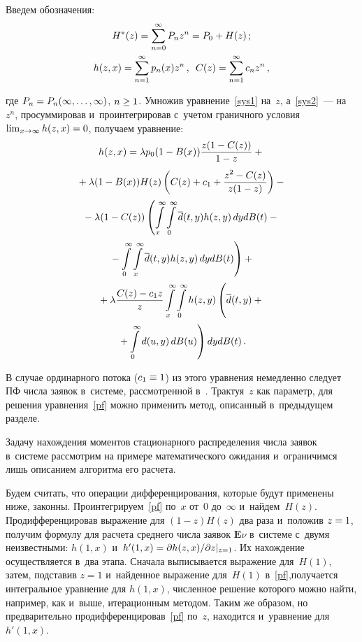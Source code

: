 \begin{multicols}{2}
Введем обозначения:
\begin{gather*}
H^*(z)=\sum\limits_{n=0}^\infty  P_n z^n=
P_0+H(z)\,; \\
h(z,x)=\sum\limits_{n=1}^\infty  p_n(x) z^n\,, \enskip
C(z)= \sum\limits_{n=1}^\infty  c_n z^n\,,
\end{gather*}

\noindent где $P_n\hm=P_n(\infty,\ld,\infty)$, $n \hm\ge 1$.
Умножив уравнение~\eqref{sys1} на~$z$, а~\eqref{sys2}~---
на~$z^n$, просуммировав и~проинтегрировав
с~учетом граничного условия $\lim\nolimits_{x\to \infty} h(z,x)\hm= 0$,
получаем уравнение:
\begin{multline}
h(z,x) = \lambda p_0 (1-B(x)) \displaystyle\frac{\displaystyle z (1-C(z))\mathstrut}{\displaystyle 1-z\mathstrut}
+ {}\\[2pt]
{}+
\lambda (1-B(x))  H(z) \left ( C(z) + c_1 + \displaystyle\frac{\displaystyle z^2 - C(z)\mathstrut}{\displaystyle z(1-z)\mathstrut} \right )
- {}
\\[2pt]
{}- \lambda (1- C(z)) \left(
\int\limits_x^\infty \int\limits_0^\infty \overline d(t,y) h(z,y)\, dy  dB(t) -{}\right.\\[2pt]
\left.{}-
\int\limits_0^\infty \int\limits_x^\infty \overline d(t,y) h(z,y)\, dy  dB(t)
\right)
+{}
\\[2pt]
{}+
\lambda \displaystyle\frac{\displaystyle C(z)-c_1 z\mathstrut}{\displaystyle z\mathstrut} \int\limits_x^\infty
\int\limits_0^\infty h(z,y) \left(
\vphantom{\int\limits_0^\infty}
\overline d(t,y) +{}\right.\\[2pt]
\left.{}+ \int\limits_0^\infty d(u,y) \,dB(u) \right)
dy  dB(t)\,.
\label{pf}
\end{multline}

\noindent В случае ординарного потока ($c_1 \hm\equiv 1$) из этого уравнения 
немедленно следует ПФ
числа заявок в~системе, рассмотренной в~\cite{n3}. Трактуя~$z$ как параметр,
для решения уравнения~\eqref{pf} можно применить метод, описанный 
в~предыдущем разделе.

Задачу нахождения моментов стационарного распределения
числа заявок в~системе рассмотрим на примере математического ожидания
и~ограничимся лишь описанием алгоритма его расчета.

Будем считать, что операции дифференцирования, которые будут применены ниже, законны.
Проинтегрируем~\eqref{pf} по~$x$ от~0 до~$\infty$ и~найдем~$H(z)$.
Продифференцировав выражение для $(1-z)H(z)$ два раза и~положив $z\hm=1$, получим формулу
для расчета среднего числа заявок $\mathbf{E}\nu$ в~системе с~двумя
неизвестными: $h(1,x)$ и~$h'(1,x)\hm=\partial h(z,x) / \partial z |_{z=1}$.
Их нахождение осуществляется в~два этапа.
Сначала выписывается выражение для~$H(1)$,
затем, подставив $z=1$ и~найденное выражение для~$H(1)$
в~\eqref{pf},\linebreak получается интегральное уравнение для $h(1,x)$,
чис\-лен\-ное решение которого можно найти, например, как и~выше,
итерационным методом. Таким же образом, но предварительно продифференцировав~\eqref{pf} 
по~$z$, находится и~уравнение для~$h'(1,x)$.


\end{multicols}
